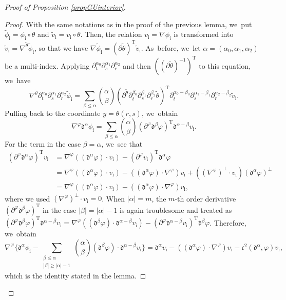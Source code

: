 \documentclass[10pt]{amsart}
\newcommand{\dt}{\partial_t}
\theoremstyle{definition}
\begin{document}
\begin{proof}[Proof of Proposition \ref{propGUinterior}]
\begin{proof}
With the same notations as in the proof of the previous lemma, we~put $\tilde{\phi}_\mathrm{i}=\phi_\mathrm{i}\circ\theta$ and $\tilde{v}_\mathrm{i}=v_\mathrm{i}\circ\theta$.
Then, the relation $v_\mathrm{i}=\nabla\phi_\mathrm{i}$ is transformed into $\tilde{v}_\mathrm{i}=\nabla^{\tilde{\theta}}\tilde{\phi}_\mathrm{i}$,
so that we have $\nabla\tilde{\phi}_\mathrm{i}=(\partial\tilde{\theta})^\mathrm{T}\tilde{v}_\mathrm{i}$. As~before, we~let $\alpha=(\alpha_0,\alpha_1,\alpha_2)$ be a multi-index.
Applying $\dt^{\alpha_0}\partial_s^{\alpha_1}\partial_r^{\alpha_2}$ and then $((\partial\tilde{\theta})^{-1})^\mathrm{T}$ to this equation, we~have
\[
\nabla^{\tilde{\theta}}\dt^{\alpha_0}\partial_s^{\alpha_1}\partial_r^{\alpha_2}\tilde{\phi}_\mathrm{i}
= \sum_{\beta\leq\alpha} \binom{\alpha}{\beta} (\partial^{\tilde{\theta}}\dt^{\beta_0}\partial_s^{\beta_1}\partial_r^{\beta_2}\tilde{\theta})^\mathrm{T}
\dt^{\alpha_0-\beta_0}\partial_s^{\alpha_1-\beta_1}\partial_r^{\alpha_2-\beta_2}\tilde{v}_\mathrm{i}.
\]
Pulling back to the coordinate $y=\theta(r,s)$, we~obtain
\[
\nabla^\varphi\mathfrak{d}^{\alpha}\phi_\mathrm{i}
= \sum_{\beta\leq\alpha} \binom{\alpha}{\beta} (\partial^\varphi\mathfrak{d}^{\beta}\varphi)^\mathrm{T}\mathfrak{d}^{\alpha-\beta}v_\mathrm{i}.
\]
For the term in the case $\beta=\alpha$, we~see that
\begin{align*}
(\partial^\varphi\mathfrak{d}^{\alpha}\varphi)^\mathrm{T}v_\mathrm{i}
&= \nabla^\varphi((\mathfrak{d}^{\alpha}\varphi)\cdot v_\mathrm{i}) - (\partial^\varphi v_\mathrm{i})^\mathrm{T}\mathfrak{d}^{\alpha}\varphi \\
&= \nabla^\varphi((\mathfrak{d}^{\alpha}\varphi)\cdot v_\mathrm{i}) - ((\mathfrak{d}^{\alpha}\varphi)\cdot\nabla^\varphi)v_\mathrm{i}
+ ((\nabla^\varphi)^\perp\cdot v_\mathrm{i})(\mathfrak{d}^{\alpha}\varphi)^\perp \\
&= \nabla^\varphi((\mathfrak{d}^{\alpha}\varphi)\cdot v_\mathrm{i}) - ((\mathfrak{d}^{\alpha}\varphi)\cdot\nabla^\varphi)v_\mathrm{i},
\end{align*}
where we used $(\nabla^\varphi)^\perp\cdot v_\mathrm{i}=0$.
When $|\alpha|=m$, the $m$-th order derivative $(\partial^\varphi\mathfrak{d}^{\beta}\varphi)^\mathrm{T}$ in the case $|\beta|=|\alpha|-1$
is again troublesome and treated as $(\partial^\varphi\mathfrak{d}^{\beta}\varphi)^\mathrm{T}\mathfrak{d}^{\alpha-\beta}v_\mathrm{i}
= \nabla^\varphi((\mathfrak{d}^{\beta}\varphi)\cdot\mathfrak{d}^{\alpha-\beta}v_\mathrm{i})
- (\partial^\varphi\mathfrak{d}^{\alpha-\beta}v_\mathrm{i})^\mathrm{T}\mathfrak{d}^{\beta}\varphi$.
Therefore, we~obtain
\[
\nabla^\varphi\biggl\{ \mathfrak{d}^{\alpha}\phi_\mathrm{i}
- \sum_{\substack{\beta\leq\alpha\\ |\beta|\geq|\alpha|-1}} \binom{\alpha}{\beta} (\mathfrak{d}^{\beta}\varphi)\cdot\mathfrak{d}^{\alpha-\beta}v_\mathrm{i} \biggr\}
= \mathfrak{d}^{\alpha}v_\mathrm{i} - ((\mathfrak{d}^{\alpha}\varphi)\cdot\nabla^\varphi)v_\mathrm{i} -\mathfrak{c}^2({\mathfrak d}^\alpha,\varphi)v_\mathrm{i},
\]
which is the identity stated in the lemma.
\end{proof}


\end{proof}
\end{document}
